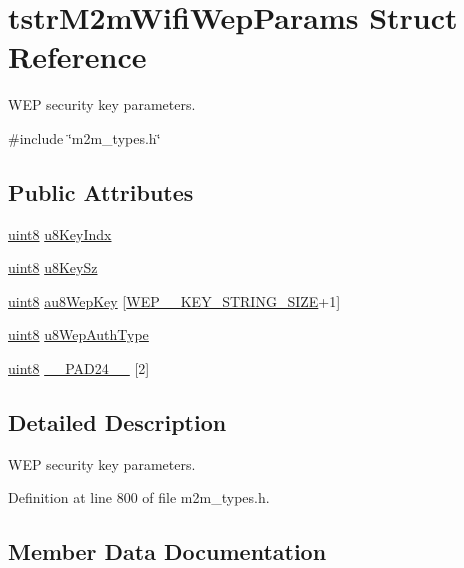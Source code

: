 \hypertarget{structtstrM2mWifiWepParams}{}\section{tstr\+M2m\+Wifi\+Wep\+Params Struct Reference}
\label{structtstrM2mWifiWepParams}


W\+EP security key parameters.  




{\ttfamily \#include \char`\"{}m2m\+\_\+types.\+h\char`\"{}}

\subsection*{Public Attributes}
\begin{DoxyCompactItemize}
\item 
\hyperlink{group__DataT_ga4df709a77647e870bbf1d955b8edc9a6}{uint8} \hyperlink{structtstrM2mWifiWepParams_adfecc4478aca1ef7aa677c316e547a44}{u8\+Key\+Indx}
\item 
\hyperlink{group__DataT_ga4df709a77647e870bbf1d955b8edc9a6}{uint8} \hyperlink{structtstrM2mWifiWepParams_ab2b55069d2a0efc1b6b4eba924dabe1b}{u8\+Key\+Sz}
\item 
\hyperlink{group__DataT_ga4df709a77647e870bbf1d955b8edc9a6}{uint8} \hyperlink{structtstrM2mWifiWepParams_ad522f2c7dc7f4d974be95f6c8a705a13}{au8\+Wep\+Key} \mbox{[}\hyperlink{group__WlanDefines_ga087f8be759b11ec0fe841d21e60367f5}{W\+E\+P\+\_\+\_\+\+K\+E\+Y\+\_\+\+S\+T\+R\+I\+N\+G\+\_\+\+S\+I\+ZE}+1\mbox{]}
\item 
\hyperlink{group__DataT_ga4df709a77647e870bbf1d955b8edc9a6}{uint8} \hyperlink{structtstrM2mWifiWepParams_a89c70e5905a86f093a28812879d1612b}{u8\+Wep\+Auth\+Type}
\item 
\hyperlink{group__DataT_ga4df709a77647e870bbf1d955b8edc9a6}{uint8} \hyperlink{structtstrM2mWifiWepParams_adb835f18fdc523d5618c9741e9deedda}{\+\_\+\+\_\+\+P\+A\+D24\+\_\+\+\_\+} \mbox{[}2\mbox{]}
\end{DoxyCompactItemize}


\subsection{Detailed Description}
W\+EP security key parameters. 

Definition at line 800 of file m2m\+\_\+types.\+h.



\subsection{Member Data Documentation}
\mbox{\label{structtstrM2mWifiWepParams_adb835f18fdc523d5618c9741e9deedda}} 
